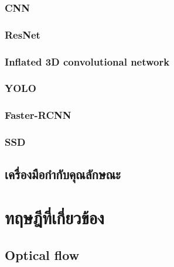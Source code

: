 \subsubsection*{CNN}

\clearpage

\subsubsection*{ResNet}


\clearpage
\subsubsection*{Inflated 3D convolutional network}

\clearpage

\subsubsection*{YOLO}

\clearpage

\subsubsection*{Faster-RCNN}

\clearpage


\subsubsection*{SSD}

\clearpage


\subsection{เครื่องมือกำกับคุณลักษณะ}




\clearpage
%
%
%

\section{ทฤษฎีที่เกี่ยวข้อง}
\subsection{Optical flow}

\clearpage
%




